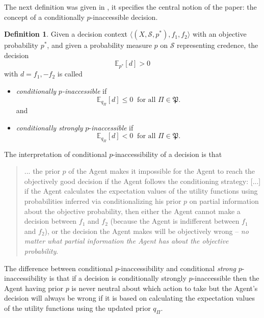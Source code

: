 \documentclass[10pt, letterpaper]{article}%
\theoremstyle{definition}
\newtheorem{definition}[theorem]{Definition}
\newcommand{\E}{\mathbb E}
\newcommand{\1}{\mathbf 1}
\begin{document}
The next definition was given in \cite{Redei-Jing2026}, it specifies the central notion of the paper: the concept of a conditionally $p$-inaccessible decision.
\begin{definition}
Given a decision context $\big\langle (X,\mathcal{S},{p}^*),f_1,f_2\big\rangle$ with an objective probability $p^*$, and given a probability measure $p$ on $\mathcal{S}$ representing credence, the decision 
\begin{equation}\label{eq:decision-3}
\E_{p^*}[d]>0
\end{equation} 
with $d=f_1,-f_2$ is called 
\begin{itemize}
\item \emph{conditionally} \emph{$p$-inaccessible} if
\begin{equation}\label{eq:cond-inacc}
\E_{q_\Pi}[d]\le 0 \ \text{ for all }  \Pi\in\mathfrak{P}.
\end{equation}
and 
\item \emph{conditionally strongly} $p$-\emph{inaccessible} if 
\begin{equation}
\E_{q_\Pi}[d]<0 \ \text{ for all }  \Pi\in\mathfrak{P}.
\end{equation}
\end{itemize}
\end{definition}
\bigskip
The interpretation of conditional $p$-inaccessibility of a decision is that
\begin{quote}
    ... the prior $p$ of the Agent makes it impossible for the Agent to reach the objectively good decision if the Agent follows the conditioning strategy: [...] if the Agent calculates the expectation values of the utility functions using probabilities inferred via conditionalizing his prior $p$ on partial information about the objective probability, then either the Agent cannot make a decision between $f_1$ and $f_2$  (because the Agent is indifferent between $f_1$ and $f_2$), or the decision the Agent makes will be objectively wrong -- \emph{no matter what partial information the Agent has about the objective probability}. \cite{Redei-Jing2026}
\end{quote}
The difference between conditional $p$-inaccessibility and conditional \emph{strong} $p$-inaccessibility is that if a decision is conditionally strongly $p$-inaccessible then the Agent having prior $p$ is never neutral about which action to take but the Agent's decision will always be wrong if it is based on calculating the expectation values of the utility functions using the updated prior $q_\Pi$. 
\end{document}
